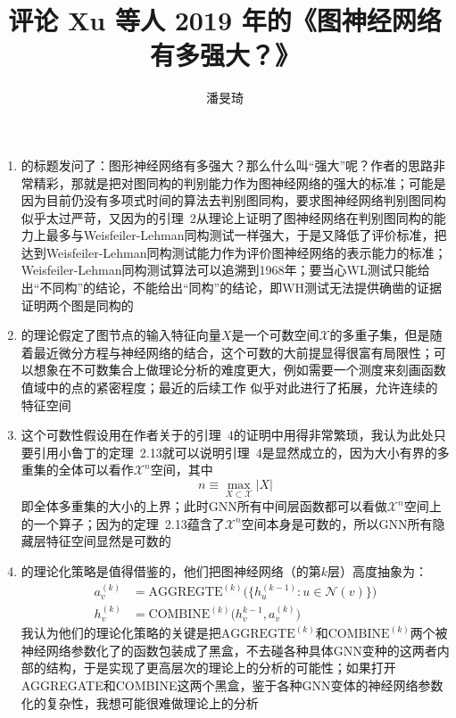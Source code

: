 \documentclass[11pt]{article}
\title{评论 Xu 等人 2019 年的《图神经网络有多强大？》}
\author{潘旻琦}
\date{\zhtoday}
\begin{document}
\maketitle

\begin{enumerate}

\item \cite{xu2018how}的标题发问了：图形神经网络有多强大？那么什么叫``强大''呢？作者的思路非常精彩，那就是把对图同构的判别能力作为图神经网络的强大的标准；可能是因为目前仍没有多项式时间的算法去判别图同构，要求图神经网络判别图同构似乎太过严苛，又因为\cite{xu2018how}的引理~2从理论上证明了图神经网络在判别图同构的能力上最多与Weisfeiler-Lehman同构测试一样强大，\cite{xu2018how}于是又降低了评价标准，把达到Weisfeiler-Lehman同构测试能力作为评价图神经网络的表示能力的标准；Weisfeiler-Lehman同构测试算法可以追溯到1968年\cite{weisfeiler1968reduction}；要当心WL测试只能给出``不同构''的结论，不能给出``同构''的结论，即WH测试无法提供确凿的证据证明两个图是同构的
\item \cite{xu2018how}的理论假定了图节点的输入特征向量$X$是一个可数空间$\mathcal{X}$的多重子集，但是随着最近微分方程与神经网络的结合，这个可数的大前提显得很富有局限性；可以想象在不可数集合上做理论分析的难度更大，例如需要一个测度来刻画函数值域中的点的紧密程度；最近的后续工作 \cite{corso2020principal}似乎对此进行了拓展，允许连续的特征空间
\item 这个可数性假设用在作者关于\cite{xu2018how}的引理~4的证明中用得非常繁琐，我认为此处只要引用小鲁丁\cite{rudin1976principles}的定理~2.13就可以说明引理~4是显然成立的，因为大小有界的多重集的全体可以看作$\mathcal{X}^n$空间，其中\[
n\equiv\max_{X\subset\mathcal{X}}|X|
\]即全体多重集的大小的上界；此时GNN所有中间层函数都可以看做$\mathcal{X}^n$空间上的一个算子；因为\cite{rudin1976principles}的定理~2.13蕴含了$\mathcal{X}^n$空间本身是可数的，所以GNN所有隐藏层特征空间显然是可数的
\item \cite{xu2018how}的理论化策略是值得借鉴的，他们把图神经网络（的第$k$层）高度抽象为：\[
\begin{split}
a_v^{(k)}&=\text{AGGREGTE}^{(k)}\big(\big\{h_u^{(k-1)}:u\in\mathcal{N}(v)\big\}\big)\\
h_v^{(k)}&=\text{COMBINE}^{(k)}\big(h_v^{k-1},a_v^{(k)}\big)
\end{split}
\]我认为他们的理论化策略的关键是把$\text{AGGREGTE}^{(k)}$和$\text{COMBINE}^{(k)}$两个被神经网络参数化了的函数包装成了黑盒，不去碰各种具体GNN变种的这两者内部的结构，于是实现了更高层次的理论上的分析的可能性；如果打开AGGREGATE和COMBINE这两个黑盒，鉴于各种GNN变体的神经网络参数化的复杂性，我想可能很难做理论上的分析

\end{enumerate}
\end{document}
